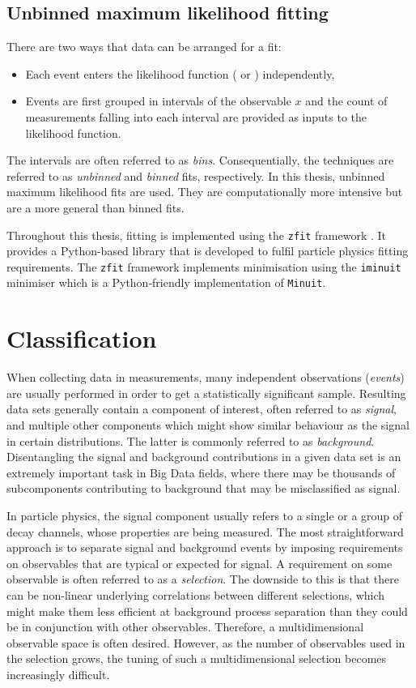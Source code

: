 \subsection{Unbinned maximum likelihood fitting}

There are two ways that data can be arranged for a fit: 

\begin{itemize}
    \item Each event enters the likelihood function ( or ) independently,
    \item Events are first grouped in intervals of the observable $x$ and the count of measurements falling into each interval are provided as inputs to the likelihood function.
\end{itemize}
The intervals are often referred to as \textit{bins}. 
Consequentially, the techniques are referred to as \textit{unbinned} and \textit{binned} fits, respectively.
In this thesis, unbinned maximum likelihood fits are used. 
They are computationally more intensive but are a more general than binned fits. 

Throughout this thesis, fitting is implemented using the \texttt{zfit} framework \cite{ESCHLE2020100508}. 
It provides a Python-based library that is developed to fulfil particle physics fitting requirements.
The \texttt{zfit} framework implements minimisation using the \texttt{iminuit} minimiser \cite{iminuit} which is a Python-friendly implementation of \texttt{Minuit}.

\section{Classification}\label{sec:classification}
When collecting data in measurements, many independent observations (\textit{events}) are usually performed in order to get a statistically significant sample.
Resulting data sets generally contain a component of interest, often referred to as \textit{signal}, and multiple other components which might show similar behaviour as the signal in certain distributions. 
The latter is commonly referred to as \textit{background}. Disentangling the signal and background contributions in a given data set is an extremely important task in Big Data fields, where there may be thousands of subcomponents contributing to background that may be misclassified as signal.

In particle physics, the signal component usually refers to a single or a group of decay channels, whose properties are being measured. 
The most straightforward approach is to separate signal and background events by imposing requirements on observables that are typical or expected for signal.
A requirement on some observable is often referred to as a \textit{selection}.
The downside to this is that there can be non-linear underlying correlations between different selections, which might make them less efficient at background process separation than they could be in conjunction with other observables. 
Therefore, a multidimensional observable space is often desired.
However, as the number of observables used in the selection grows, the tuning of such a multidimensional selection becomes increasingly difficult.


